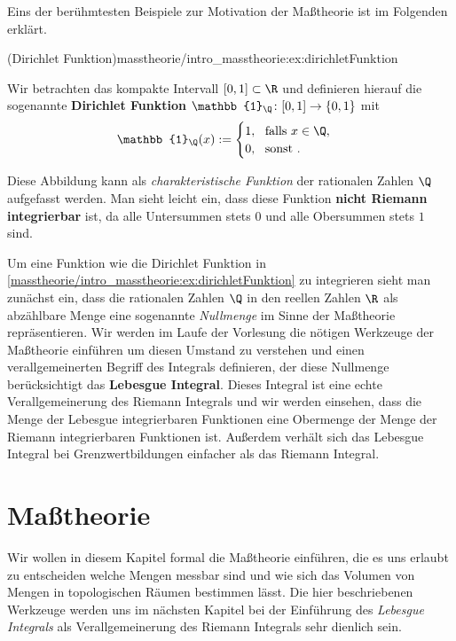 \documentclass[letterpaper,10pt,english]{jupyterBook}
\begin{document}
\par
Eins der berühmtesten Beispiele zur Motivation der Maßtheorie ist im Folgenden erklärt.
\begin{example}{(Dirichlet Funktion)}{masstheorie/intro_masstheorie:ex:dirichletFunktion}



\par
Wir betrachten das kompakte Intervall \([0,1] \subset \R\) und definieren hierauf die sogenannte \textbf{Dirichlet Funktion} \(\mathbb{1}_\Q \colon [0,1] \rightarrow \{0,1\}\) mit
\begin{align*}
\mathbb{1}_\Q(x) := \begin{cases} 1, \ \text{ falls } x \in \Q, \\ 0, \ \text{ sonst }.\end{cases}
\end{align*}
\par
Diese Abbildung kann als \emph{charakteristische Funktion} der rationalen Zahlen \(\Q\) aufgefasst werden.
Man sieht leicht ein, dass diese Funktion \textbf{nicht Riemann integrierbar} ist, da alle Untersummen stets \(0\) und alle Obersummen stets \(1\) sind.
\end{example}

\par
Um eine Funktion wie die Dirichlet Funktion in \cref{masstheorie/intro_masstheorie:ex:dirichletFunktion} zu integrieren sieht man zunächst ein, dass die rationalen Zahlen \(\Q\) in den reellen Zahlen \(\R\) als abzählbare Menge eine sogenannte \emph{Nullmenge} im Sinne der Maßtheorie repräsentieren.
Wir werden im Laufe der Vorlesung die nötigen Werkzeuge der Maßtheorie einführen um diesen Umstand zu verstehen und einen verallgemeinerten Begriff des Integrals definieren, der diese Nullmenge berücksichtigt   das \textbf{Lebesgue Integral}.
Dieses Integral ist eine echte Verallgemeinerung des Riemann Integrals und wir werden einsehen, dass die Menge der Lebesgue integrierbaren Funktionen eine Obermenge der Menge der Riemann integrierbaren Funktionen ist.
Außerdem verhält sich das Lebesgue Integral bei Grenzwertbildungen einfacher als das Riemann Integral.


\section{Maßtheorie}
\label{\detokenize{masstheorie/masstheorie:masztheorie}}\label{\detokenize{masstheorie/masstheorie::doc}}
\par
Wir wollen in diesem Kapitel formal die Maßtheorie einführen, die es uns erlaubt zu entscheiden welche Mengen messbar sind und wie sich das Volumen von Mengen in topologischen Räumen bestimmen lässt.
Die hier beschriebenen Werkzeuge werden uns im nächsten Kapitel bei der Einführung des \emph{Lebesgue Integrals} als Verallgemeinerung des Riemann Integrals sehr dienlich sein.
\end{document}
